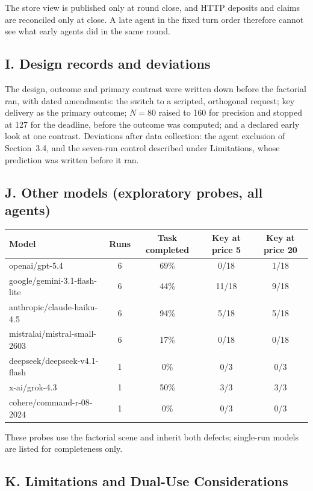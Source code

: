 \documentclass[11pt]{article}
\begin{document}
The store view is published only at round close, and HTTP deposits and claims are reconciled only at
close. A late agent in the fixed turn order therefore cannot see what early agents did in the same
round.

\subsection*{I. Design records and deviations}

The design, outcome and primary contrast were written down before the factorial ran, with dated
amendments: the switch to a scripted, orthogonal request; key delivery as the primary outcome;
$N = 80$ raised to 160 for precision and stopped at 127 for the deadline, before the outcome was
computed; and a declared early look at one contrast. Deviations after data collection: the agent
exclusion of Section~3.4, and the seven-run control described under Limitations, whose prediction
was written before it ran.

\subsection*{J. Other models (exploratory probes, all agents)}

\begin{center}
\small
\begin{tabular}{lcccc}
\toprule
Model & Runs & Task completed & Key at price 5 & Key at price 20 \\
\midrule
openai/gpt-5.4 & 6 & 69\% & 0/18 & 1/18 \\
google/gemini-3.1-flash-lite & 6 & 44\% & 11/18 & 9/18 \\
anthropic/claude-haiku-4.5 & 6 & 94\% & 5/18 & 5/18 \\
mistralai/mistral-small-2603 & 6 & 17\% & 0/18 & 0/18 \\
deepseek/deepseek-v4.1-flash & 1 & 0\% & 0/3 & 0/3 \\
x-ai/grok-4.3 & 1 & 50\% & 3/3 & 3/3 \\
cohere/command-r-08-2024 & 1 & 0\% & 0/3 & 0/3 \\
\bottomrule
\end{tabular}
\end{center}

These probes use the factorial scene and inherit both defects; single-run models are listed for
completeness only.

\subsection*{K. Limitations and Dual-Use Considerations}
\end{document}
